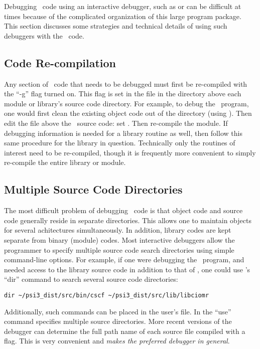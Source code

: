 %
%
%
%
Debugging \PSIthree\ code using an interactive debugger, such as 
or  can be difficult at times because of the complicated organization of
this large program package.  This section discusses some strategies and
technical details of using such debuggers with the \PSIthree\ code.

\subsection{Code Re-compilation}
Any section of \PSIthree\ code that needs to be debugged must first be re-compiled
with the ``-g'' flag turned on.  This flag is set in the 
file in the directory above each module or library's source code directory.
For example, to debug the \PSIcscf\ program, one would first clean the
existing object code out of the 
directory (using ).  Then edit the  file
above the \PSIcscf\ source code: set .  Then re-compile the
module.  If debugging information is needed for a library routine as well,
then follow this same procedure for the library in question.  Technically
only the routines of interest need to be re-compiled, though it is
frequently more convenient to simply re-compile the entire library or
module.

\subsection{Multiple Source Code Directories}
The most difficult problem of debugging \PSIthree\ code is that object code and
source code generally reside in separate directories.  This allows one to
maintain objects for several achitectures simultaneously.  In addition,
library codes are kept separate from binary (module) codes.  Most
interactive debuggers allow the programmer to specify multiple source code
search directories using simple command-line options.  For example, if one
were debugging the \PSIcscf\ program, and needed access to the
 library source code in addition to that of \PSIcscf, one
could use 's ``dir'' command to search several source code
directories:
\begin{verbatim}
dir ~/psi3_dist/src/bin/cscf ~/psi3_dist/src/lib/libciomr
\end{verbatim}
Additionally, such commands can be placed in the user's 
file.  In  the ``use'' command specifies multiple source directories.
More recent versions of the  debugger can determine the full path
name of each source file compiled with a  flag.  This is very
convenient and {\em makes  the preferred debugger in general}.

